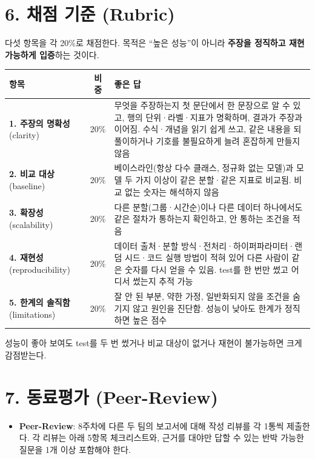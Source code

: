 \documentclass[12pt]{article}
\begin{document}
\section*{6. 채점 기준 (Rubric)}
다섯 항목을 각 20\%로 채점한다. 목적은 ``높은 성능''이 아니라 \textbf{주장을 정직하고 재현 가능하게 입증}하는 것이다.
\begin{center}
\small
\begin{tabular}{@{}p{3.3cm}cp{7.4cm}@{}}
\toprule
항목 & 비중 & 좋은 답 \\
\midrule
\textbf{1. 주장의 명확성} (clarity) & 20\% & 무엇을 주장하는지 첫 문단에서 한 문장으로 알 수 있고, 행의 단위·라벨·지표가 명확하며, 결과가 주장과 이어짐. 수식·개념을 읽기 쉽게 쓰고, 같은 내용을 되풀이하거나 기호를 불필요하게 늘려 혼잡하게 만들지 않음 \\
\textbf{2. 비교 대상} (baseline) & 20\% & 베이스라인(항상 다수 클래스, 정규화 없는 모델)과 모델 두 가지 이상이 같은 분할·같은 지표로 비교됨. 비교 없는 숫자는 해석하지 않음 \\
\textbf{3. 확장성} (scalability) & 20\% & 다른 분할(그룹·시간순)이나 다른 데이터 하나에서도 같은 절차가 통하는지 확인하고, 안 통하는 조건을 적음 \\
\textbf{4. 재현성} (reproducibility) & 20\% & 데이터 출처·분할 방식·전처리·하이퍼파라미터·랜덤 시드·코드 실행 방법이 적혀 있어 다른 사람이 같은 숫자를 다시 얻을 수 있음. test를 한 번만 썼고 어디서 썼는지 추적 가능 \\
\textbf{5. 한계의 솔직함} (limitations) & 20\% & 잘 안 된 부분, 약한 가정, 일반화되지 않을 조건을 숨기지 않고 원인을 진단함. 성능이 낮아도 한계가 정직하면 높은 점수 \\
\bottomrule
\end{tabular}
\end{center}
\vspace{4pt}
성능이 좋아 보여도 test를 두 번 썼거나 비교 대상이 없거나 재현이 불가능하면 크게 감점받는다.

\section*{7. 동료평가 (Peer-Review)}
\begin{itemize}
\item \textbf{Peer-Review}: 8주차에 다른 두 팀의 보고서에 대해
  작성 리뷰를 각 1통씩 제출한다. 각 리뷰는 아래 5항목 체크리스트와,
  근거를 대야만 답할 수 있는 반박 가능한 질문을 1개 이상 포함해야
  한다.
\end{itemize}
\end{document}
